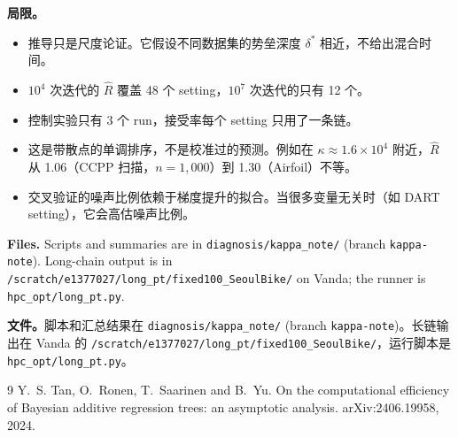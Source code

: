 \documentclass[11pt]{article}
\newcommand{\Rhat}{\hat R}
\begin{document}
\begin{zhbox}
\textbf{局限。}
\begin{itemize}
\item 推导只是尺度论证。它假设不同数据集的势垒深度 $\delta^\ast$ 相近，不给出混合时间。
\item $10^4$ 次迭代的 $\Rhat$ 覆盖 48 个 setting，$10^7$ 次迭代的只有 12 个。
\item 控制实验只有 3 个 run，接受率每个 setting 只用了一条链。
\item 这是带散点的单调排序，不是校准过的预测。例如在 $\kappa\approx1.6\times10^4$ 附近，$\Rhat$ 从 1.06（CCPP 扫描，$n=1{,}000$）到 1.30（Airfoil）不等。
\item 交叉验证的噪声比例依赖于梯度提升的拟合。当很多变量无关时（如 DART setting），它会高估噪声比例。
\end{itemize}
\end{zhbox}


\textbf{Files.} Scripts and summaries are in \texttt{diagnosis/kappa\_note/} (branch \texttt{kappa-note}). Long-chain output is in \texttt{/scratch/e1377027/long\_pt/fixed100\_SeoulBike/} on Vanda; the runner is \texttt{hpc\_opt/long\_pt.py}.

\begin{zhbox}
\textbf{文件。}脚本和汇总结果在 \texttt{diagnosis/kappa\_note/} (branch \texttt{kappa-note})。长链输出在 Vanda 的 \texttt{/scratch/e1377027/long\_pt/fixed100\_SeoulBike/}，运行脚本是 \texttt{hpc\_opt/long\_pt.py}。
\end{zhbox}

\begin{thebibliography}{9}
Y.~S. Tan, O.~Ronen, T.~Saarinen and B.~Yu.
\newblock On the computational efficiency of Bayesian additive regression trees: an asymptotic analysis.
\newblock arXiv:2406.19958, 2024.
\end{thebibliography}
\end{document}
